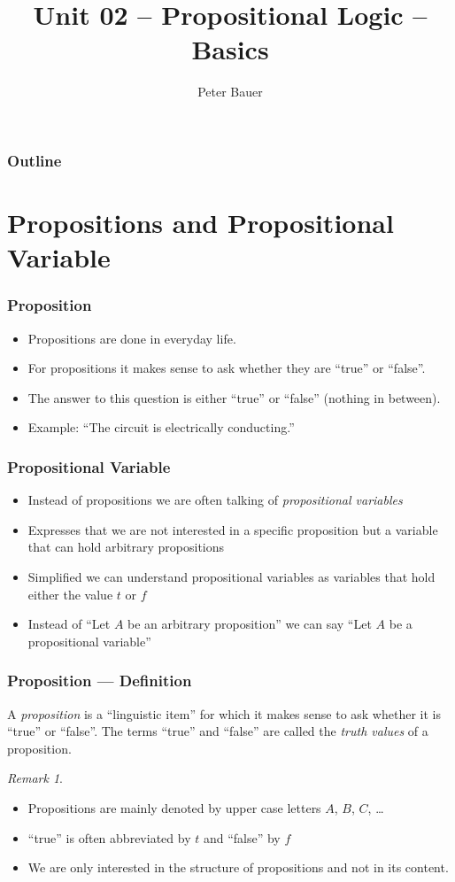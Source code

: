 \documentclass{beamer}
\title{Unit 02 -- Propositional Logic -- Basics}
\author{Peter Bauer}
\date{} %
\theoremstyle{remark}
\newtheorem{remark}[theorem]{Remark}
\begin{document}
\frame{\titlepage}

\begin{frame}
	\frametitle{Outline}
	\tableofcontents
\end{frame}

\section{Propositions and Propositional Variable}
\begin{frame}
\frametitle{Proposition}
\begin{itemize}
	\item Propositions are done in everyday life.
	\pause
	\item For propositions it makes sense to ask whether they are ``true'' or ``false''.
	\pause
	\item The answer to this question is either ``true'' or ``false'' (nothing in between).
	\pause
	\item Example: ``The circuit is electrically conducting.''
\end{itemize}	
	
\end{frame}

\begin{frame}
\frametitle{Propositional Variable}
\begin{itemize}
	\item Instead of propositions we are often talking of {\em propositional variables}
	\pause
	\item Expresses that we are not interested in a specific proposition but a variable that can hold arbitrary propositions
	\pause
	\item Simplified we can understand propositional variables as variables that hold either the value $t$ or $f$
	\pause
	\item Instead of ``Let $A$ be an arbitrary proposition'' we can say ``Let $A$ be a propositional variable''
\end{itemize}
\end{frame}

\begin{frame}
\frametitle{Proposition --- Definition}
\begin{definition}
A {\em proposition} is a ``linguistic item'' for which it makes sense to ask whether it is ``true'' or ``false''. The terms ``true'' and ``false'' are called the {\em truth values} of a proposition.
\end{definition}

\pause
\begin{remark}
\begin{itemize}
 	\item Propositions are mainly denoted by upper case letters $A$, $B$, $C$, \ldots
	\pause
	\item  ``true'' is often abbreviated by $t$ and ``false'' by $f$
	\pause
	\item We are only interested in the structure of propositions and not in its content.
\end{itemize}

\end{remark}
\end{frame}
\end{document}
